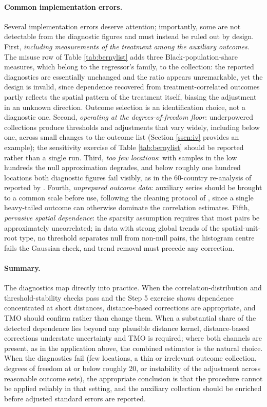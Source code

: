 \documentclass[varwidth,bib]{statapress}
\begin{document}
\paragraph{Common implementation errors.}  Several implementation errors deserve attention; importantly, some are not detectable from the diagnostic figures and must instead be ruled out by design.  First, \textit{including measurements of the treatment among the auxiliary outcomes}.  The misuse row of Table \ref{tab:bernylist} adds three Black-population-share measures, which belong to the regressor's family, to the collection: the reported diagnostics are essentially unchanged and the ratio appears unremarkable, yet the design is invalid, since dependence recovered from treatment-correlated outcomes partly reflects the spatial pattern of the treatment itself, biasing the adjustment in an unknown direction.  Outcome selection is an identification choice, not a diagnostic one.  Second, \textit{operating at the degrees-of-freedom floor}: underpowered collections produce thresholds and adjustments that vary widely, including below one, across small changes to the outcome list (Section \ref{sscn:iv} provides an example); the sensitivity exercise of Table \ref{tab:bernylist} should be reported rather than a single run.  Third, \textit{too few locations}: with samples in the low hundreds the null approximation degrades, and below roughly one hundred locations both diagnostic figures fail visibly, as in the 60-country re-analysis of \citet{Funkeetal2023} reported by \citet{Dellavignaetal2025}.  Fourth, \textit{unprepared outcome data}: auxiliary series should be brought to a common scale before use, following the cleaning protocol of \citet[Appendix B.1]{Dellavignaetal2025}, since a single heavy-tailed outcome can otherwise dominate the correlation estimates.  Fifth, \textit{pervasive spatial dependence}: the sparsity assumption requires that most pairs be approximately uncorrelated; in data with strong global trends of the spatial-unit-root type, no threshold separates null from non-null pairs, the histogram centre fails the Gaussian check, and trend removal must precede any correction.

\paragraph{Summary.}  The diagnostics map directly into practice.  When the correlation-distribution and threshold-stability checks pass and the Step 5 exercise shows dependence concentrated at short distances, distance-based corrections are appropriate, and TMO should confirm rather than change them.  When a substantial share of the detected dependence lies beyond any plausible distance kernel, distance-based corrections understate uncertainty and TMO is required; where both channels are present, as in the application above, the combined estimator is the natural choice.  When the diagnostics fail (few locations, a thin or irrelevant outcome collection, degrees of freedom at or below roughly 20, or instability of the adjustment across reasonable outcome sets), the appropriate conclusion is that the procedure cannot be applied reliably in that setting, and the auxiliary collection should be enriched before adjusted standard errors are reported.
\end{document}
